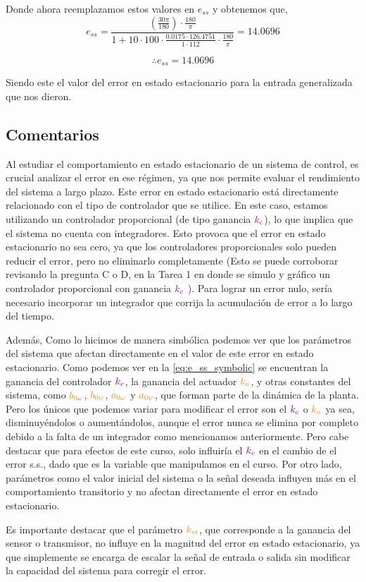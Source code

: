 Donde ahora reemplazamos estos valores en \(e_{ss}\) y obtenemos que,
\begin{equation}
  e_{ss} = \frac{\left(\frac{30 \pi}{180}\right) \cdot \frac{180}{\pi}}{1 + 10 \cdot 100 \cdot \frac{0.0175 \cdot 126.4751}{1 \cdot 112} \cdot \frac{180}{\pi}} = 14.0696
\end{equation}

\[
\boxed{\therefore e_{ss} = 14.0696}
\]

Siendo este el valor del error en estado estacionario para la entrada generalizada que nos dieron.

\FloatBarrier
\subsection{Comentarios}

Al estudiar el comportamiento en estado estacionario de un sistema de control, es crucial analizar el error en ese régimen, ya que nos permite evaluar el rendimiento del sistema a largo plazo. Este error en estado estacionario está directamente relacionado con el tipo de controlador que se utilice. En este caso, estamos utilizando un controlador proporcional (de tipo ganancia \(\mathbin{\color{violet}k_{c}}\)), lo que implica que el sistema no cuenta con integradores. Esto provoca que el error en estado estacionario no sea cero, ya que los controladores proporcionales solo pueden reducir el error, pero no eliminarlo completamente (Esto se puede corroborar revisando la pregunta C o D, en la Tarea 1 en donde se simulo y gráfico un controlador proporcional con ganancia \(\mathbin{\color{violet}k_{c}} \) ). Para lograr un error nulo, sería necesario incorporar un integrador que corrija la acumulación de error a lo largo del tiempo.

Además, Como lo hicimos de manera simbólica podemos ver que los parámetros del sistema que afectan directamente en el valor de este error en estado estacionario. Como podemos ver en la \eqref{eq:e_ss_symbolic} se encuentran la ganancia del controlador \(\mathbin{\color{violet}k_{c}}\), la ganancia del actuador \(\nara{k_a}\), y otras constantes del sistema, como \(\nara{b_{0\omega}}\), \(\nara{b_{0\psi}}\), \(\nara{a_{0\omega}}\) y \(\nara{a_{0\psi}}\), que forman parte de la dinámica de la planta. Pero los únicos que podemos variar para modificar el error son el \(\mathbin{\color{violet}k_{c}}\) o \(\nara{k_a}\) ya sea, disminuyéndolos o aumentándolos, aunque el error nunca se elimina por completo debido a la falta de un integrador como mencionamos anteriormente. Pero cabe destacar que para efectos de este curso, solo influiría el \(\mathbin{\color{violet}k_{c}}\) en el cambio de el error s.s., dado que es la variable que manipulamos en el curso. Por otro lado, parámetros como el valor inicial del sistema o la señal deseada influyen más en el comportamiento transitorio y no afectan directamente el error en estado estacionario.

Es importante destacar que el parámetro \(\nara{k_{st}}\), que corresponde a la ganancia del sensor o transmisor, no influye en la magnitud del error en estado estacionario, ya que simplemente se encarga de escalar la señal de entrada o salida sin modificar la capacidad del sistema para corregir el error.

